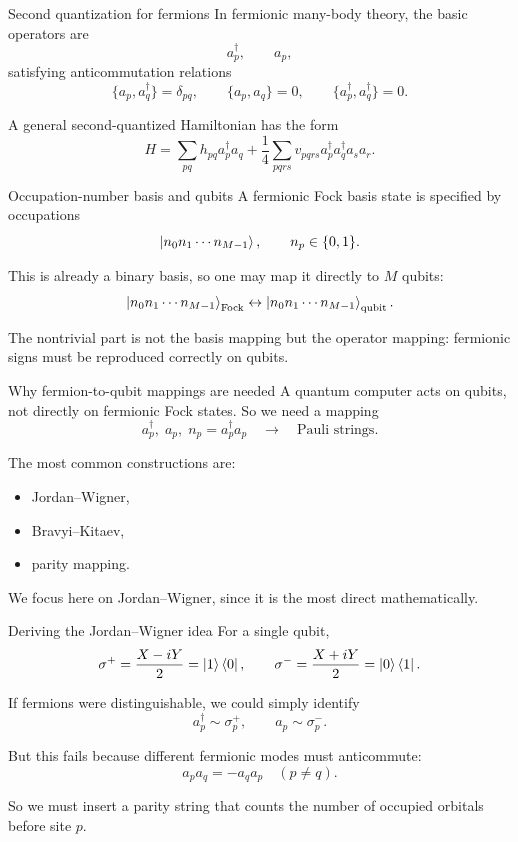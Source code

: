 \documentclass[aspectratio=169]{beamer}
\begin{document}
\begin{frame}{Second quantization for fermions}
In fermionic many-body theory, the basic operators are
\[
a_p^\dagger,\qquad a_p,
\]
satisfying anticommutation relations
\[
\{a_p,a_q^\dagger\}=\delta_{pq},
\qquad
\{a_p,a_q\}=0,
\qquad
\{a_p^\dagger,a_q^\dagger\}=0.
\]

A general second-quantized Hamiltonian has the form
\[
H
=
\sum_{pq} h_{pq} a_p^\dagger a_q
+
\frac{1}{4}\sum_{pqrs} v_{pqrs} a_p^\dagger a_q^\dagger a_s a_r.
\]
\end{frame}

\begin{frame}{Occupation-number basis and qubits}
A fermionic Fock basis state is specified by occupations
\[
\ket{n_0 n_1 \cdots n_{M-1}},
\qquad
n_p\in\{0,1\}.
\]

This is already a binary basis, so one may map it directly to \(M\) qubits:
\[
\ket{n_0 n_1 \cdots n_{M-1}}_{\mathrm{Fock}}
\leftrightarrow
\ket{n_0 n_1 \cdots n_{M-1}}_{\mathrm{qubit}}.
\]

The nontrivial part is not the basis mapping but the operator mapping:
fermionic signs must be reproduced correctly on qubits.
\end{frame}

\begin{frame}{Why fermion-to-qubit mappings are needed}
A quantum computer acts on qubits, not directly on fermionic Fock states.
So we need a mapping
\[
a_p^\dagger,\; a_p,\; n_p=a_p^\dagger a_p
\quad \longrightarrow \quad
\text{Pauli strings}.
\]

The most common constructions are:
\begin{itemize}
\item Jordan--Wigner,
\item Bravyi--Kitaev,
\item parity mapping.
\end{itemize}

We focus here on Jordan--Wigner, since it is the most direct mathematically.
\end{frame}

\begin{frame}{Deriving the Jordan--Wigner idea}
For a single qubit,
\[
\sigma^+ = \frac{X-iY}{2} = \ket{1}\bra{0},
\qquad
\sigma^- = \frac{X+iY}{2} = \ket{0}\bra{1}.
\]

If fermions were distinguishable, we could simply identify
\[
a_p^\dagger \sim \sigma_p^+,\qquad a_p \sim \sigma_p^-.
\]

But this fails because different fermionic modes must anticommute:
\[
a_p a_q = - a_q a_p \quad (p\neq q).
\]

So we must insert a parity string that counts the number of occupied orbitals before site \(p\).
\end{frame}
\end{document}

